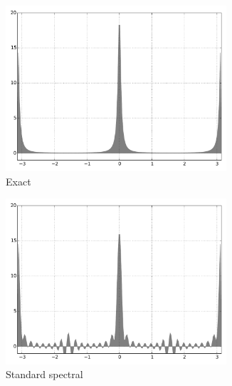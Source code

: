 \documentclass[final,leqno]{siamart}
\begin{document}
\begin{figure}[p]
	\hspace*{-.5cm}
	\begin{subfigure}{0.36\textwidth}
		\includegraphics[width=0.9\textwidth]{./images/exact_1D.pdf}
		\caption{Exact}
		\label{fig:exact}
	\end{subfigure}
	\hspace*{-.65cm}
	\begin{subfigure}{0.36\textwidth}
		\includegraphics[width=0.9\textwidth]{./images/standard_spectral_1D.pdf}
		\caption{Standard spectral}
		\label{fig:standard spectral}
	\end{subfigure}
	\hspace*{-.65cm}
	\begin{subfigure}{0.36\textwidth}

\end{subfigure}
\end{figure}
\end{document}
